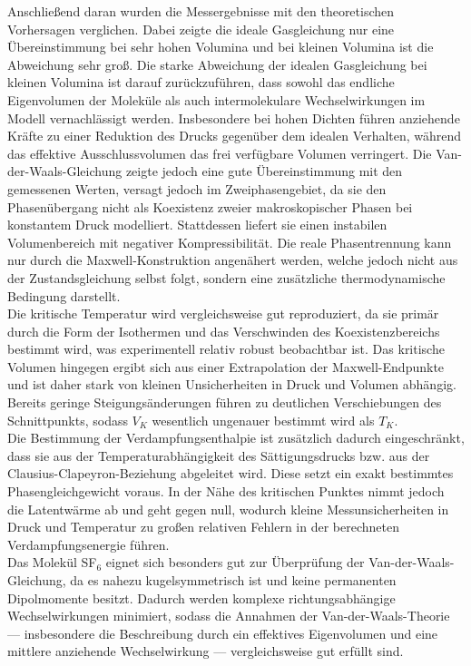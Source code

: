 \noindent Anschließend daran wurden die Messergebnisse mit den theoretischen Vorhersagen verglichen. Dabei zeigte die ideale Gasgleichung nur eine Übereinstimmung bei sehr hohen Volumina und bei kleinen Volumina ist die Abweichung sehr groß.
Die starke Abweichung der idealen Gasgleichung bei kleinen Volumina
ist darauf zurückzuführen, dass sowohl das endliche Eigenvolumen
der Moleküle als auch intermolekulare Wechselwirkungen im Modell
vernachlässigt werden. Insbesondere bei hohen Dichten führen
anziehende Kräfte zu einer Reduktion des Drucks gegenüber dem
idealen Verhalten, während das effektive Ausschlussvolumen
das frei verfügbare Volumen verringert.
Die Van-der-Waals-Gleichung zeigte jedoch eine gute Übereinstimmung mit den gemessenen Werten, versagt jedoch im Zweiphasengebiet, da sie
den Phasenübergang nicht als Koexistenz zweier makroskopischer Phasen
bei konstantem Druck modelliert. Stattdessen liefert sie einen
instabilen Volumenbereich mit negativer Kompressibilität. Die reale
Phasentrennung kann nur durch die Maxwell-Konstruktion angenähert
werden, welche jedoch nicht aus der Zustandsgleichung selbst folgt,
sondern eine zusätzliche thermodynamische Bedingung darstellt.
\\
Die kritische Temperatur wird vergleichsweise gut reproduziert,
da sie primär durch die Form der Isothermen und das Verschwinden
des Koexistenzbereichs bestimmt wird, was experimentell relativ
robust beobachtbar ist. Das kritische Volumen hingegen ergibt sich
aus einer Extrapolation der Maxwell-Endpunkte und ist daher stark
von kleinen Unsicherheiten in Druck und Volumen abhängig.
Bereits geringe Steigungsänderungen führen zu deutlichen
Verschiebungen des Schnittpunkts, sodass \( V_K \) wesentlich
ungenauer bestimmt wird als \( T_K \).\\
Die Bestimmung der Verdampfungsenthalpie ist zusätzlich dadurch
eingeschränkt, dass sie aus der Temperaturabhängigkeit des
Sättigungsdrucks bzw. aus der Clausius-Clapeyron-Beziehung
abgeleitet wird. Diese setzt ein exakt bestimmtes
Phasengleichgewicht voraus. In der Nähe des kritischen Punktes
nimmt jedoch die Latentwärme ab und geht gegen null, wodurch
kleine Messunsicherheiten in Druck und Temperatur zu großen
relativen Fehlern in der berechneten Verdampfungsenergie führen.
\\
Das Molekül SF$_6$ eignet sich besonders gut zur Überprüfung
der Van-der-Waals-Gleichung, da es nahezu kugelsymmetrisch ist
und keine permanenten Dipolmomente besitzt. Dadurch werden
komplexe richtungsabhängige Wechselwirkungen minimiert, sodass
die Annahmen der Van-der-Waals-Theorie — insbesondere die
Beschreibung durch ein effektives Eigenvolumen und eine
mittlere anziehende Wechselwirkung — vergleichsweise gut erfüllt
sind.